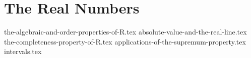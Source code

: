 \chapter{The Real Numbers}
{the-algebraic-and-order-properties-of-R.tex}
{absolute-value-and-the-real-line.tex}
{the-completeness-property-of-R.tex}
{applications-of-the-supremum-property.tex}
{intervals.tex}
